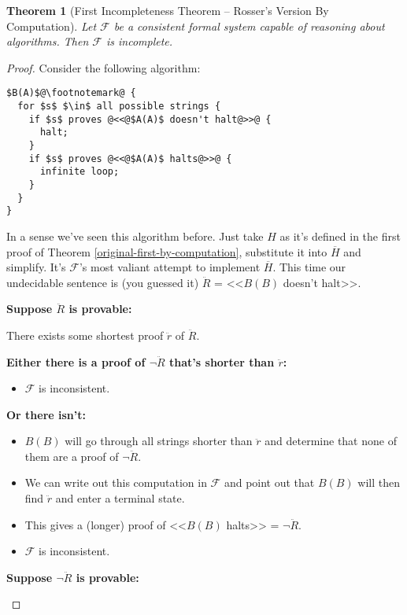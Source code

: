 \documentclass{article}
\theoremstyle{theorem}
\newtheorem{theorem}{Theorem}
\newcommand{\nameditem}[1]{\item\textbf{#1}}
\newcommand{\impl}{\item[$\Rightarrow$]}
\begin{document}
\begin{theorem}[First Incompleteness Theorem -- Rosser's Version By Computation]
Let $\mathcal{F}$ be a consistent formal system capable of reasoning about algorithms. Then $\mathcal{F}$ is incomplete.
\end{theorem}

\begin{proof}
Consider the following algorithm:\\[0.5em]
\begin{minipage}{\linewidth}
\begin{lstlisting}
$B(A)$@\footnotemark@ {
  for $s$ $\in$ all possible strings {
    if $s$ proves @<<@$A(A)$ doesn't halt@>>@ {
      halt;
    }
    if $s$ proves @<<@$A(A)$ halts@>>@ {
      infinite loop;
    }
  }
}
\end{lstlisting}
\end{minipage}
In a sense we've seen this algorithm before. Just take $H$ as it's defined in the first proof of Theorem \ref{original-first-by-computation}, substitute it into $\overline{H}$ and simplify. It's $\mathcal{F}$'s most valiant attempt to implement $\overline{H}$. This time our undecidable sentence is (you guessed it) $\ddot{R}$ = <<$B(B)$ doesn't halt>>.
\begin{description}
\nameditem{Suppose $\ddot{R}$ is provable:}
\begin{description}
\impl There exists some shortest proof $\ddot{r}$ of $\ddot{R}$.
\nameditem{Either there is a proof of $\neg \ddot{R}$ that's shorter than $\ddot{r}$:}
\begin{itemize}
\impl $\mathcal{F}$ is inconsistent. \lightning
\end{itemize}
\nameditem{Or there isn't:}
\begin{itemize}
\impl $B(B)$ will go through all strings shorter than $\ddot{r}$ and determine that none of them are a proof of $\neg \ddot{R}$.
\impl We can write out this computation in $\mathcal{F}$ and point out that $B(B)$ will then find $\ddot{r}$ and enter a terminal state.
\impl This gives a (longer) proof of <<$B(B)$ halts>> = $\neg \ddot{R}$.
\impl $\mathcal{F}$ is inconsistent. \lightning
\end{itemize}
\end{description}
\nameditem{Suppose $\neg \ddot{R}$ is provable:}
\begin{description}

\end{description}
\end{description}
\end{proof}
\end{document}
